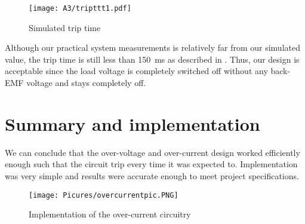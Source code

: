 \begin{figure}[H]
    \centering
    \texttt{[image: A3/tripttt1.pdf]}
    \caption{Simulated trip time}
    \label{fig:sim_tripttt}
\end{figure}

Although our practical system measurements is relatively far from our simulated value, the trip time is still less than \SI{150}{\milli s} as described in \cite{assignment_3}. Thus, our design is acceptable since the load voltage is completely switched off without any back-EMF voltage and stays completely off.




\section{Summary and implementation}
We can conclude that the over-voltage and over-current design worked efficiently enough such that the circuit trip every time it was expected to. Implementation was very simple and results were accurate enough to meet project specifications.

\begin{figure}[H]
    \centering
  	\texttt{[image: Picures/overcurrentpic.PNG]}
	\caption{Implementation of the over-current circuitry} \label{subfig:OC_pcb}
 \end{figure}






























